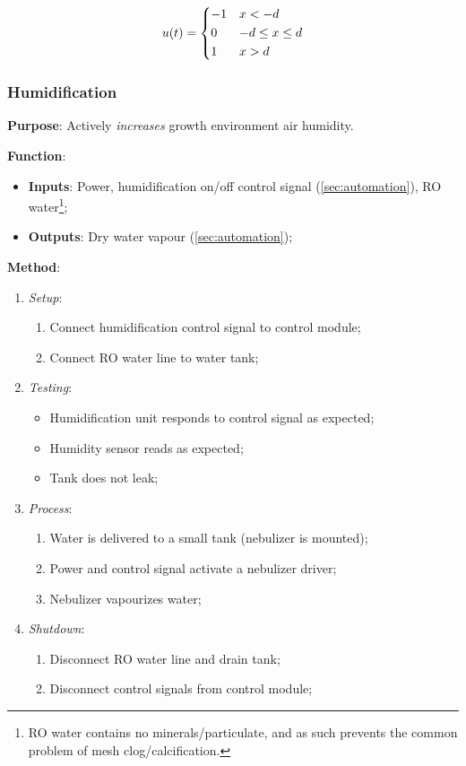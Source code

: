 \begin{gather}
    \label{eqn:bangbang}
    u(t)=\begin{dcases}
        -1  &   x < -d \\
        0   &   -d \leq x \leq d \\
        1   &   x > d \\
    \end{dcases}
\end{gather}

\clearpage

\subsubsection{Humidification}
\label{sec:humidification}

\textbf{Purpose}: Actively \textit{increases} growth environment air humidity.

\textbf{Function}:
\begin{itemize}
    \item \textbf{Inputs}: Power, humidification on/off control signal (\ref{sec:automation}), RO water\footnote{RO water contains no minerals/particulate, and as such prevents the common problem of mesh clog/calcification.};
    \item \textbf{Outputs}: Dry water vapour (\ref{sec:automation});
\end{itemize}

\textbf{Method}:
\begin{enumerate}
    \item \textit{Setup}:
    \begin{enumerate}
        \item Connect humidification control signal to control module;
        \item Connect RO water line to water tank;
    \end{enumerate}
    \item \textit{Testing}:
    \begin{itemize}
        \item Humidification unit responds to control signal as expected;
        \item Humidity sensor reads as expected;
        \item Tank does not leak;
    \end{itemize}
    \item \textit{Process}:
    \begin{enumerate}
        \item Water is delivered to a small tank (nebulizer is mounted);
        \item Power and control signal activate a nebulizer driver;
        \item Nebulizer vapourizes water;
    \end{enumerate}
    \item \textit{Shutdown}:
    \begin{enumerate}
        \item Disconnect RO water line and drain tank;
        \item Disconnect control signals from control module;
    \end{enumerate}
\end{enumerate}

